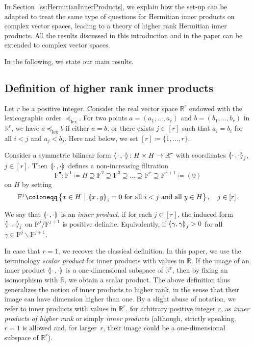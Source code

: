 \documentclass[AHL,Unicode,longabstracts]{cedram}
\newcommand{\llangle}{\mathopen{\langle\mkern -3.1mu\lvert}}
\newcommand{\rrangle}{\mathclose{\rvert\mkern -3.1mu\rangle}}
\newcommand{\highinn}[2]{{\llangle#2\rrangle_{#1}}}
\newcommand{\st}{\bigm|}
\newcommand{\filter}{\mathrm{F}}
\newcommand{\R}{\mathbb{R}}
\renewcommand{\setminus}{\smallsetminus}
\newcommand{\lexeq}{\preceq_{\mathrm{lex}}}
\renewcommand*{\to}{\mathchoice{\longrightarrow}{\rightarrow}{\rightarrow}{\rightarrow}}
\begin{document}
In Section~\ref{ss:HermitianInnerProducts}, we explain how the set-up can be adapted to treat the same type of questions for Hermitian inner products on complex vector spaces, leading to a theory of higher rank Hermitian inner products. All the results discussed in this introduction and in the paper can be extended to complex vector spaces.



In the following, we state our main results.


\subsection{Definition of higher rank inner products}

Let $r$ be a positive integer. Consider the real vector space $\R^r$ endowed with the lexicographic order $\lexeq$. For two points $a =(a_1, \dots, a_r)$ and $b=(b_1, \dots, b_r)$ in $\R^r$, we have $a \lexeq b$ if either $a=b$, or there exists $j\in [r]$ such that $a_i=b_i$ for all $i < j$ and $a_j<b_j$. Here and below, we set $[r] \coloneqq \{1, \dots, r\}$.



Consider a symmetric bilinear form $\highinn{}{\cdot \,, \cdot} \colon H \times H \to \R^r$ with coordinates $\highinn{j}{\cdot\,,\cdot}$, $j \in [r]$. Then $\highinn{}{\cdot \,, \cdot}$ defines a non-increasing filtration
\[
\filter^\bullet\colon \filter^1\coloneqq H \supseteq \filter^2 \supseteq \filter^3 \supseteq \dots \supseteq \filter^r \supseteq \filter^{r+1} \coloneqq (0)
\]
on $H$ by setting
\begin{align*}
\filter^j \coloneqq \left\{ x \in H \st \,\highinn{}{x \,, y}_i = 0 \text{ for all $i <j$ and all $y \in H$}\right\}, \quad j \in [r].
\end{align*}


We say that $\highinn{}{\cdot\,, \cdot}$ is an \emph{inner product}, if for each $j \in [r]$, the induced form $\highinn{j}{\cdot\,, \cdot}$ on $\filter^j / \filter^{j+1}$ is positive definite. Equivalently, if $\highinn{j}{\gamma, \gamma} >0$ for all $\gamma \in \filter^j \setminus \filter^{j+1}$.


In case that $r=1$, we recover the classical definition. In this paper, we use the terminology \emph{scalar product} for inner products with values in $\R$. If the image of an inner product $\highinn{}{\cdot\,, \cdot}$ is a one-dimensional subspace of $\R^r$, then by fixing an isomorphism with $\R$, we obtain a scalar product. The above definition thus generalizes the notion of inner products to higher rank, in the sense that their image can have dimension higher than one. By a slight abuse of notation, we refer to inner products with values in $\R^r$, for arbitrary positive integer $r$, as \emph{inner products of higher rank} or simply \emph{inner products} (although, strictly speaking, $r=1$ is allowed and, for larger~$r$, their image could be a one-dimensional subspace of $\R^r$).
\end{document}
